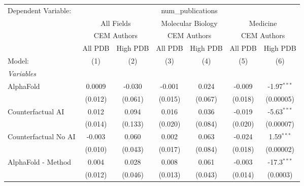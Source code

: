 \begingroup
\centering
\begin{tabular}{lcccccc}
   \tabularnewline \midrule \midrule
   Dependent Variable: & \multicolumn{6}{c}{num\_publications}\\
 & \multicolumn{2}{c}{All Fields} & \multicolumn{2}{c}{Molecular Biology} & \multicolumn{2}{c}{Medicine} \\
\cmidrule(lr){2-3} \cmidrule(lr){4-5} \cmidrule(lr){6-7}
 & \multicolumn{2}{c}{CEM Authors} & \multicolumn{2}{c}{CEM Authors} & \multicolumn{2}{c}{CEM Authors} \\
\cmidrule(lr){2-3} \cmidrule(lr){4-5} \cmidrule(lr){6-7}
 & \multicolumn{1}{c}{All PDB} & \multicolumn{1}{c}{High PDB} & \multicolumn{1}{c}{All PDB} & \multicolumn{1}{c}{High PDB} & \multicolumn{1}{c}{All PDB} & \multicolumn{1}{c}{High PDB} \\
\cmidrule(lr){2-2} \cmidrule(lr){3-3} \cmidrule(lr){4-4} \cmidrule(lr){5-5} \cmidrule(lr){6-6} \cmidrule(lr){7-7}
   Model:                                                     & (1)     & (2)         & (3)          & (4)            & (5)          & (6)\\  
   \midrule
   \emph{Variables}\\
   AlphaFold                                                  & 0.0009  & -0.030      & -0.001       & 0.024          & -0.009       & -1.97$^{***}$\\   
                                                              & (0.012) & (0.061)     & (0.015)      & (0.067)        & (0.018)      & (0.00005)\\   
   Counterfactual AI                                          & 0.012   & 0.094       & 0.016        & 0.036          & -0.019       & -5.63$^{***}$\\   
                                                              & (0.014) & (0.133)     & (0.020)      & (0.084)        & (0.020)      & (0.00007)\\   
   Counterfactual No AI                                       & -0.003  & 0.060       & 0.002        & 0.063          & -0.024       & 1.59$^{***}$\\   
                                                              & (0.010) & (0.043)     & (0.017)      & (0.084)        & (0.018)      & (0.00002)\\   
   AlphaFold - Method                                         & 0.004   & 0.028       & 0.008        & 0.061          & -0.003       & -17.3$^{***}$\\   
                                                              & (0.012) & (0.046)     & (0.013)      & (0.043)        & (0.014)      & (0.0003)\\   

\end{tabular}

